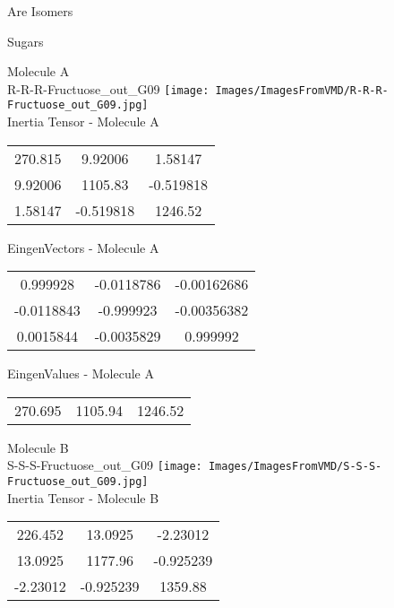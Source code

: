 \begin{center}
\vtab
\vtab
\textcolor{NavyBlue}{\Large Are Isomers}
\end{center}
\newpage

\vtab[-2cm]
\begin{center}
{\large Sugars}
\end{center}
\begin{multicols}{2}
\begin{center}
Molecule A \\ 
R-R-R-Fructuose\_out\_G09
\texttt{[image: Images/ImagesFromVMD/R-R-R-Fructuose\_out\_G09.jpg]}
\\
Inertia Tensor - Molecule A \\
\vtab
\begin{tabular}{|c c c|}
270.815	 & 	9.92006	 & 	1.58147	 \\
9.92006	 & 	1105.83	 & 	-0.519818	 \\
1.58147	 & 	-0.519818	 & 	1246.52
\end{tabular}

\vtab
 EingenVectors - Molecule A     \\
\vtab
\begin{tabular}{|c c c|}
0.999928	 & 	-0.0118786	 & 	-0.00162686	 \\
-0.0118843	 & 	-0.999923	 & 	-0.00356382	 \\
0.0015844	 & 	-0.0035829	 & 	0.999992
\end{tabular}

\vtab
 EingenValues - Molecule A     \\
\vtab
\begin{tabular}{|c c c|}
270.695	 & 	1105.94	 & 	1246.52
\end{tabular}
\columnbreak

Molecule B \\ 
S-S-S-Fructuose\_out\_G09
\texttt{[image: Images/ImagesFromVMD/S-S-S-Fructuose\_out\_G09.jpg]}
\\
Inertia Tensor - Molecule B \\
\vtab
\begin{tabular}{|c c c|}
226.452	 & 	13.0925	 & 	-2.23012	 \\
13.0925	 & 	1177.96	 & 	-0.925239	 \\
-2.23012	 & 	-0.925239	 & 	1359.88
\end{tabular}


\end{center}
\end{multicols}
